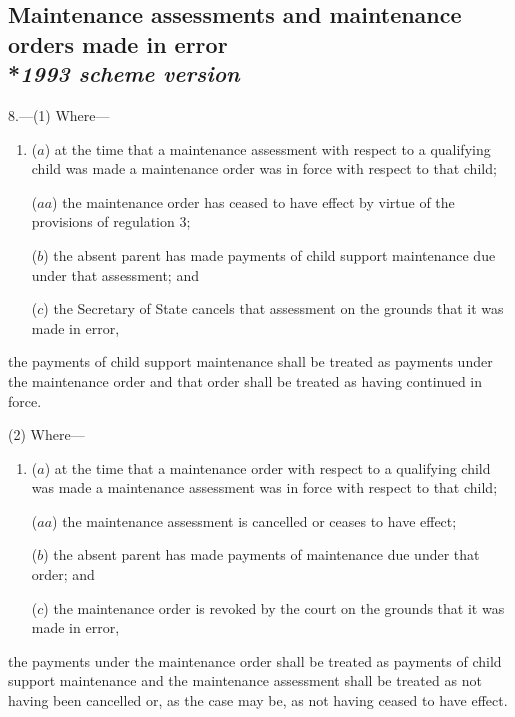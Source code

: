 \documentclass[12pt,a4paper]{article}
\begin{document}
\subsection[8. Maintenance assessments and maintenance orders made in error --- \emph{1993 scheme version}]{Maintenance assessments and maintenance orders made in error\\*\emph{1993 scheme version}}

8.—(1) Where—
\begin{enumerate}\item[]
($a$) at the time that a maintenance assessment with respect to a qualifying child was made a maintenance order was in force with respect to that child;

($aa$) the maintenance order has ceased to have effect by virtue of the provisions of regulation 3;

($b$) the absent parent has made payments of child support maintenance due under that assessment; and

($c$) 
the Secretary of State  %
cancels that assessment on the grounds that it was made in error,
\end{enumerate}
the payments of child support maintenance shall be treated as payments under the maintenance order and that order shall be treated as having continued in force.

(2) Where—
\begin{enumerate}\item[]
($a$) at the time that a maintenance order with respect to a qualifying child was made a maintenance assessment was in force with respect to that child;

($aa$) the maintenance assessment is cancelled or ceases to have effect;

($b$) the absent parent has made payments of maintenance due under that order; and

($c$) the maintenance order is revoked by the court on the grounds that it was made in error,
\end{enumerate}
the payments under the maintenance order shall be treated as payments of child support maintenance and the maintenance assessment shall be treated as not having been cancelled or, as the case may be,
as not having ceased to have effect. %
\end{document}
